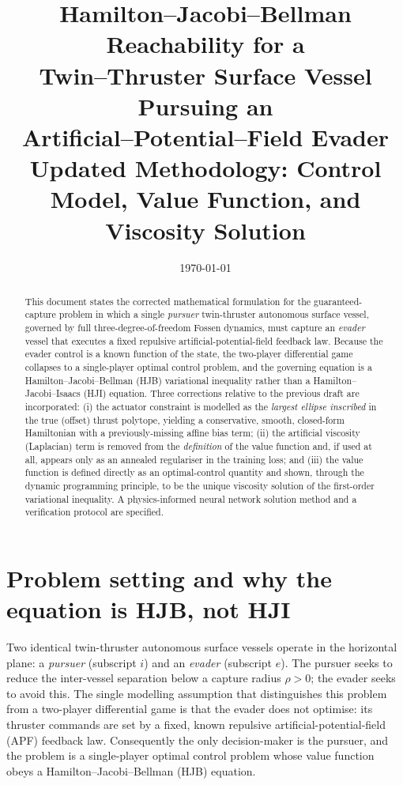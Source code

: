 \documentclass[11pt]{article}
\title{\textbf{Hamilton--Jacobi--Bellman Reachability for a\\
Twin--Thruster Surface Vessel Pursuing an\\
Artificial--Potential--Field Evader}\\[4pt]
\large Updated Methodology: Control Model, Value Function, and Viscosity Solution}
\author{}
\date{\today}
\begin{document}
\maketitle

\begin{abstract}
This document states the corrected mathematical formulation for the guaranteed-capture
problem in which a single \emph{pursuer} twin-thruster autonomous surface vessel, governed by
full three-degree-of-freedom Fossen dynamics, must capture an \emph{evader} vessel that executes
a fixed repulsive artificial-potential-field feedback law. Because the evader control is a known
function of the state, the two-player differential game collapses to a single-player optimal
control problem, and the governing equation is a Hamilton--Jacobi--Bellman (HJB) variational
inequality rather than a Hamilton--Jacobi--Isaacs (HJI) equation. Three corrections relative to
the previous draft are incorporated: (i) the actuator constraint is modelled as the
\emph{largest ellipse inscribed} in the true (offset) thrust polytope, yielding a conservative,
smooth, closed-form Hamiltonian with a previously-missing affine bias term; (ii) the artificial
viscosity (Laplacian) term is removed from the \emph{definition} of the value function and, if
used at all, appears only as an annealed regulariser in the training loss; and (iii) the value
function is defined directly as an optimal-control quantity and shown, through the dynamic
programming principle, to be the unique viscosity solution of the first-order variational
inequality. A physics-informed neural network solution method and a verification protocol are
specified.
\end{abstract}

\tableofcontents

\section{Problem setting and why the equation is HJB, not HJI}

Two identical twin-thruster autonomous surface vessels operate in the horizontal plane: a
\emph{pursuer} (subscript $i$) and an \emph{evader} (subscript $e$). The pursuer seeks to reduce
the inter-vessel separation below a capture radius $\rho>0$; the evader seeks to avoid this. The
single modelling assumption that distinguishes this problem from a two-player differential game is
that the evader does not optimise: its thruster commands are set by a fixed, known repulsive
artificial-potential-field (APF) feedback law. Consequently the only decision-maker is the
pursuer, and the problem is a single-player optimal control problem whose value function obeys a
Hamilton--Jacobi--Bellman (HJB) equation.
\end{document}
